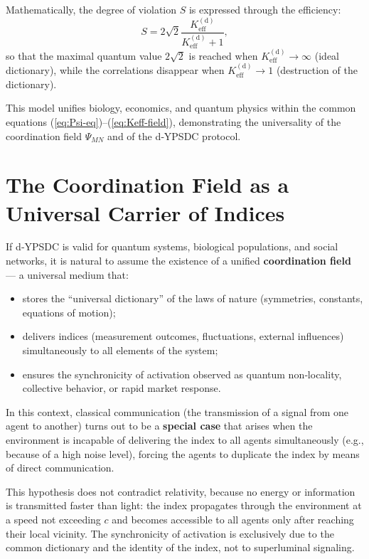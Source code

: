 \documentclass[12pt,a4paper]{article}
\begin{document}
	Mathematically, the degree of violation \(S\) is expressed through the efficiency:
	\begin{equation}
		S = 2\sqrt{2} \frac{K_{\mathrm{eff}}^{\mathrm{(d)}}}{K_{\mathrm{eff}}^{\mathrm{(d)}} + 1},
	\end{equation}
	so that the maximal quantum value \(2\sqrt{2}\) is reached when \(K_{\mathrm{eff}}^{\mathrm{(d)}} \to \infty\) (ideal dictionary), while the correlations disappear when \(K_{\mathrm{eff}}^{\mathrm{(d)}} \to 1\) (destruction of the dictionary).
	
	This model unifies biology, economics, and quantum physics within the common equations (\ref{eq:Psi-eq})--(\ref{eq:Keff-field}), demonstrating the universality of the coordination field \(\Psi_{MN}\) and of the d‑YPSDC protocol.
	
	\section{The Coordination Field as a Universal Carrier of Indices}
	
	If d‑YPSDC is valid for quantum systems, biological populations, and social networks, it is natural to assume the existence of a unified \textbf{coordination field} — a universal medium that:
	
	\begin{itemize}
		\item stores the “universal dictionary” of the laws of nature (symmetries, constants, equations of motion);
		\item delivers indices (measurement outcomes, fluctuations, external influences) simultaneously to all elements of the system;
		\item ensures the synchronicity of activation observed as quantum non‑locality, collective behavior, or rapid market response.
	\end{itemize}
	
	In this context, classical communication (the transmission of a signal from one agent to another) turns out to be a \textbf{special case} that arises when the environment is incapable of delivering the index to all agents simultaneously (e.g., because of a high noise level), forcing the agents to duplicate the index by means of direct communication.
	
	This hypothesis does not contradict relativity, because no energy or information is transmitted faster than light: the index propagates through the environment at a speed not exceeding \(c\) and becomes accessible to all agents only after reaching their local vicinity. The synchronicity of activation is exclusively due to the common dictionary and the identity of the index, not to superluminal signaling.
	
\end{document}
